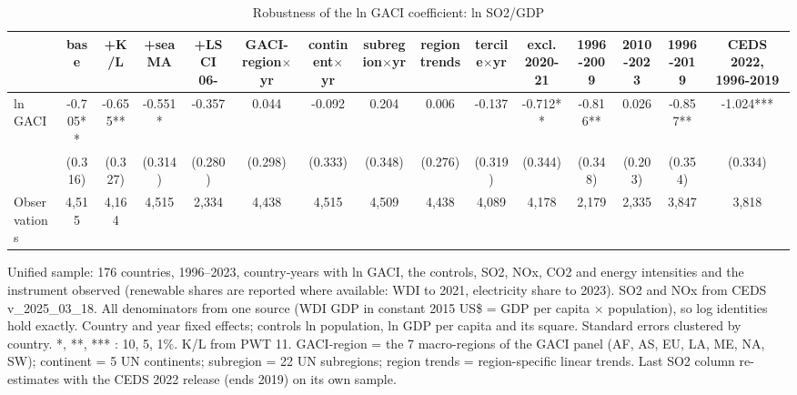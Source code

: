 \begin{table}[htbp]\centering\small
\caption{Robustness of the ln GACI coefficient: ln SO2/GDP}\label{tab:A1a}
\begin{tabular}{lcccccccccccccc}
\toprule
 & base & +K/L & +sea MA & +LSCI 06- & GACI-region$\times$yr & continent$\times$yr & subregion$\times$yr & region trends & tercile$\times$yr & excl. 2020-21 & 1996-2009 & 2010-2023 & 1996-2019 & CEDS 2022, 1996-2019 \\
\midrule
ln GACI & -0.705** & -0.655** & -0.551* & -0.357 & 0.044 & -0.092 & 0.204 & 0.006 & -0.137 & -0.712** & -0.816** & 0.026 & -0.857** & -1.024*** \\
 & (0.316) & (0.327) & (0.314) & (0.280) & (0.298) & (0.333) & (0.348) & (0.276) & (0.319) & (0.344) & (0.348) & (0.203) & (0.354) & (0.334) \\
\midrule
Observations & 4,515 & 4,164 & 4,515 & 2,334 & 4,438 & 4,515 & 4,509 & 4,438 & 4,089 & 4,178 & 2,179 & 2,335 & 3,847 & 3,818 \\
\bottomrule
\end{tabular}
\begin{minipage}{0.95\textwidth}\footnotesize Unified sample: 176 countries, 1996--2023, country-years with ln GACI, the controls, SO2, NOx, CO2 and energy intensities and the instrument observed (renewable shares are reported where available: WDI to 2021, electricity share to 2023). SO2 and NOx from CEDS v\_2025\_03\_18. All denominators from one source (WDI GDP in constant 2015 US\$ = GDP per capita $\times$ population), so log identities hold exactly. Country and year fixed effects; controls ln population, ln GDP per capita and its square. Standard errors clustered by country. *, **, *** : 10, 5, 1\%. K/L from PWT 11. GACI-region = the 7 macro-regions of the GACI panel (AF, AS, EU, LA, ME, NA, SW); continent = 5 UN continents; subregion = 22 UN subregions; region trends = region-specific linear trends. Last SO2 column re-estimates with the CEDS 2022 release (ends 2019) on its own sample.\end{minipage}
\end{table}
